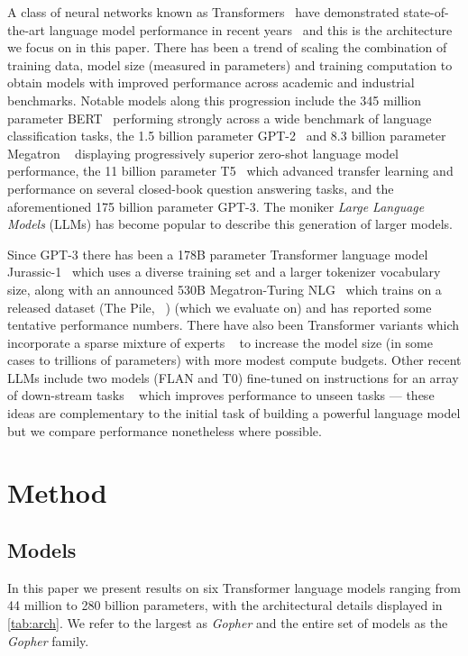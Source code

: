 \documentclass[11pt, a4paper, logo, internal, copyright, nonumbering]{deepmind}
\newcommand{\gopher}{\textit{Gopher}\xspace}
\begin{document}
A class of neural networks known as Transformers~\citep{vaswani2017attention} have demonstrated state-of-the-art language model performance in recent years~\citep{dai2019transformer, radford2018improving, radford2019language} and this is the architecture we focus on in this paper. There has been a trend of scaling the combination of training data, model size (measured in parameters) and training computation to obtain models with improved performance across academic and industrial benchmarks. Notable models along this progression include the 345 million parameter BERT~\citep{devlin2019bert} performing strongly across a wide benchmark of language classification tasks, the 1.5 billion parameter GPT-2~\citep{radford2018improving} and 8.3 billion parameter Megatron ~\citep{shoeybi2019megatron} displaying progressively superior zero-shot language model performance, the 11 billion parameter T5~\citep{raffel2019exploring} which advanced transfer learning and performance on several closed-book question answering tasks, and the aforementioned 175 billion parameter GPT-3. The moniker \textit{Large Language Models} (LLMs) has become popular to describe this generation of larger models.

Since GPT-3 there has been a 178B parameter Transformer language model Jurassic-1~\citep{jurassic} which uses a diverse training set and a larger tokenizer vocabulary size, along with an announced 530B Megatron-Turing NLG~\citep{Megatron-Turing} which trains on a released dataset (The Pile, ~\citet{pile}) (which we evaluate on) and has reported some tentative performance numbers.
There have also been Transformer variants which incorporate a sparse mixture of experts ~\citep{fedus2021switch, roller2021hash} to increase the model size (in some cases to trillions of parameters) with more modest compute budgets. 
Other recent LLMs include two models (FLAN and T0) fine-tuned on instructions for an array of down-stream tasks ~\citep{sanh2021multitask, wei2021finetuned} which improves performance to unseen tasks --- these ideas are complementary to the initial task of building a powerful language model but we compare performance nonetheless where possible.

\section{Method}
\label{sec:method}

\subsection{Models}
\label{method:models}
In this paper we present results on six Transformer language models ranging from 44 million to 280 billion parameters, with the architectural details displayed in \autoref{tab:arch}. We refer to the largest as \gopher and the entire set of models as the \gopher family.
\end{document}
